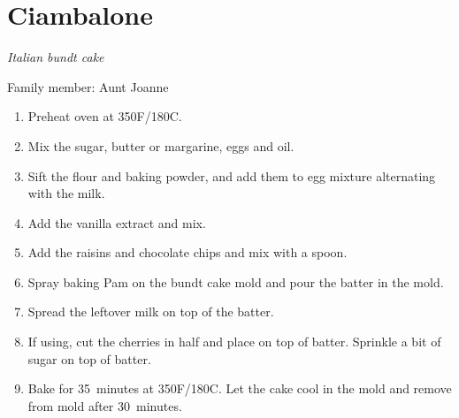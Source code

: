 \chapter{Ciambalone}
\label{ch:ciambalone}


\textit{Italian bundt cake}

Family member: Aunt Joanne

\begin{enumerate}
    \item Preheat oven at 350\degree F/180\degree C.
    \item Mix the sugar, butter or margarine, eggs and oil.
    \item Sift the flour and baking powder, and add them to egg mixture alternating with the milk.
    \item Add the vanilla extract and mix.
    \item Add the raisins and chocolate chips and mix with a spoon.
    \item Spray baking Pam on the bundt cake mold and pour the batter in the mold.
    \item Spread the leftover milk on top of the batter.
    \item If using, cut the cherries in half and place on top of batter. Sprinkle a bit of sugar on top of batter.
    \item Bake for 35~minutes at 350\degree F/180\degree C. Let the cake cool in the mold and remove from mold after 30~minutes.
\end{enumerate}


